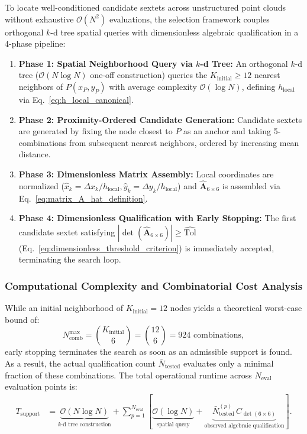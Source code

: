 \documentclass[preprint,12pt]{elsarticle}
\begin{document}
To locate well-conditioned candidate sextets across unstructured point clouds without exhaustive $\mathcal{O}(N^2)$ evaluations, the selection framework couples orthogonal $k$-d tree spatial queries \cite{bentley1975multidimensional,parreira2006efficient,fasshauer2007meshfree,goncalves2025tese,wu2026high} with dimensionless algebraic qualification in a 4-phase pipeline:
\begin{enumerate}
    \item \textbf{Phase 1: Spatial Neighborhood Query via $k$-d Tree:} An orthogonal $k$-d tree ($\mathcal{O}(N \log N)$ one-off construction) queries the $K_{\mathrm{initial}} \ge 12$ nearest neighbors of $P(x_P, y_P)$ with average complexity $\mathcal{O}(\log N)$, defining $h_{\mathrm{local}}$ via Eq.~\eqref{eq:h_local_canonical}.
    \item \textbf{Phase 2: Proximity-Ordered Candidate Generation:} Candidate sextets are generated by fixing the node closest to $P$ as an anchor and taking 5-combinations from subsequent nearest neighbors, ordered by increasing mean distance.
    \item \textbf{Phase 3: Dimensionless Matrix Assembly:} Local coordinates are normalized ($\hat{x}_k = \Delta x_k/h_{\mathrm{local}}, \hat{y}_k = \Delta y_k/h_{\mathrm{local}}$) and $\widehat{\mathbf{A}}_{6 \times 6}$ is assembled via Eq.~\eqref{eq:matrix_A_hat_definition}.
    \item \textbf{Phase 4: Dimensionless Qualification with Early Stopping:} The first candidate sextet satisfying $|\det(\widehat{\mathbf{A}}_{6\times6})| \ge \widehat{\mathrm{Tol}}$ (Eq.~\eqref{eq:dimensionless_threshold_criterion}) is immediately accepted, terminating the search loop.
\end{enumerate}

\subsubsection{Computational Complexity and Combinatorial Cost Analysis}
\label{subsubsec:computational_complexity}

While an initial neighborhood of $K_{\mathrm{initial}} = 12$ nodes yields a theoretical worst-case bound of:
\begin{equation}
    N_{\mathrm{comb}}^{\mathrm{max}} = \binom{K_{\mathrm{initial}}}{6} = \binom{12}{6} = 924 \text{ combinations},
    \label{eq:binomial_combinations}
\end{equation}
early stopping terminates the search as soon as an admissible support is found. As a result, the actual qualification count $\bar{N}_{\mathrm{tested}}$ evaluates only a minimal fraction of these combinations. The total operational runtime across $N_{\mathrm{eval}}$ evaluation points is:
\begin{align}
    T_{\mathrm{support}} & = \underbrace{\mathcal{O}(N \log N)}_{\text{$k$-d tree construction}}
    + \sum_{p=1}^{N_{\mathrm{eval}}} \left[ \underbrace{\mathcal{O}(\log N)}_{\text{spatial query}} + \underbrace{\bar{N}_{\mathrm{tested}}^{(p)} \, C_{\det(6 \times 6)}}_{\text{observed algebraic qualification}} \right].
    \label{eq:support_total_complexity}
\end{align}
\end{document}
